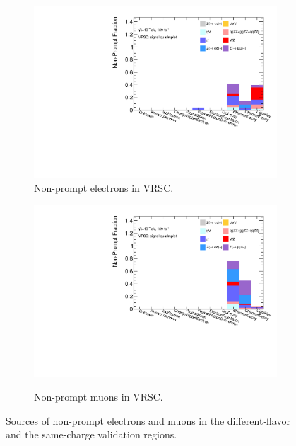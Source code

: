 \begin{figure}[!htbp]
\begin{subfigure}{.49\textwidth}
        \includegraphics[width=.9\linewidth]{figures/Analysis/Background/NonPromptCRSCSignal_Electrons_.pdf}
    \caption{Non-prompt electrons in VRSC.\label{fig:VRSC_Elec_NonPromptComp}}
    \end{subfigure}
    \begin{subfigure}{.49\textwidth}
        \centering
        {\includegraphics[width=.9\linewidth]{figures/Analysis/Background/NonPromptCRSCSignal_Muons_.pdf}}\\
        \caption{Non-prompt muons in VRSC.\label{fig:VRSC_Muon_NonPromptComp}}
    \end{subfigure}
    \caption{ Sources of non-prompt electrons and muons in the different-flavor and the same-charge validation regions. \label{fig:VRNonPromptComposition}}
\end{figure}

